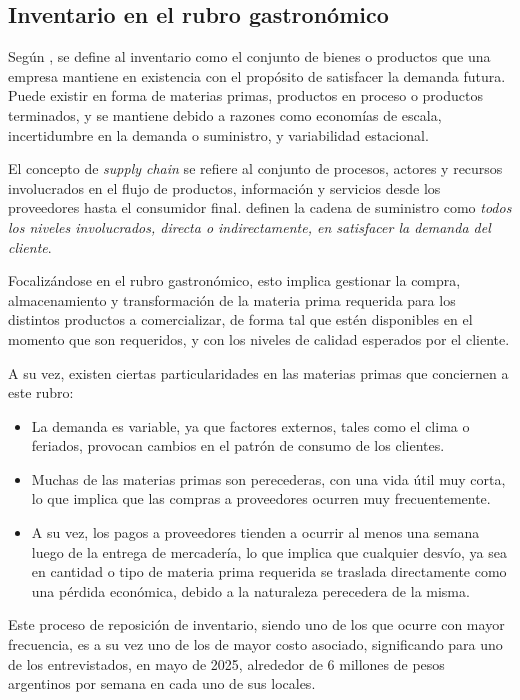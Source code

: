 \subsection{Inventario en el rubro gastronómico}

Según \parencite{chopra2019supply}, se define al inventario como el conjunto de bienes o productos que una empresa mantiene en existencia con el propósito de satisfacer la demanda futura. Puede existir en forma de materias primas, productos en proceso o productos terminados, y se mantiene debido a razones como economías de escala, incertidumbre en la demanda o suministro, y variabilidad estacional.

El concepto de \emph{supply chain} se refiere al conjunto de procesos, actores y recursos involucrados en el flujo de productos, información y servicios desde los proveedores hasta el consumidor final. \parencite{chopra2019supply} definen la cadena de suministro como \guillemotleft \emph{todos los niveles involucrados, directa o indirectamente, en satisfacer la demanda del cliente}\guillemotright.

Focalizándose en el rubro gastronómico, esto implica gestionar la compra, almacenamiento y transformación de la materia prima requerida para los distintos productos a comercializar, de forma tal que estén disponibles en el momento que son requeridos, y con los niveles de calidad esperados por el cliente.

 A su vez, existen ciertas particularidades en las materias primas que conciernen a este rubro:

 \begin{itemize}
    \item La demanda es variable, ya que factores externos, tales como el clima o feriados, provocan cambios en el patrón de consumo de los clientes.

    \item Muchas de las materias primas son perecederas, con una vida útil muy corta, lo que implica que las compras a proveedores ocurren muy frecuentemente.

    \item A su vez, los pagos a proveedores tienden a ocurrir al menos una semana luego de la entrega de mercadería, lo que implica que cualquier desvío, ya sea en cantidad o tipo de materia prima requerida se traslada directamente como una pérdida económica, debido a la naturaleza perecedera de la misma.
\end{itemize}

Este proceso de reposición de inventario, siendo uno de los que ocurre con mayor frecuencia, es a su vez uno de los de mayor costo asociado, significando para uno de los entrevistados, en mayo de 2025, alrededor de 6 millones de pesos argentinos por semana en cada uno de sus locales.


